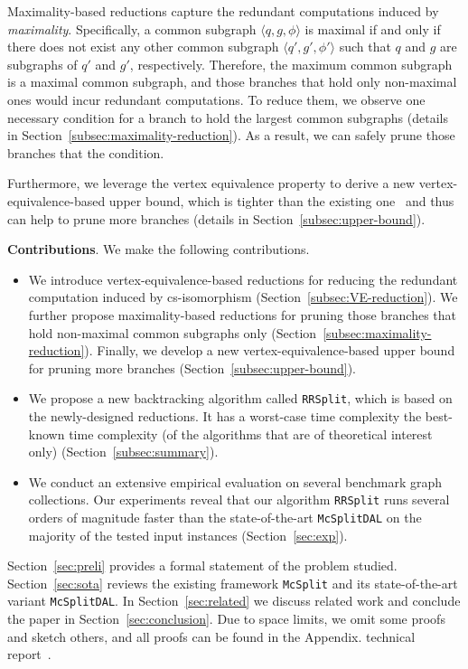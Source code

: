 Maximality-based reductions capture the redundant computations induced by \emph{maximality}. Specifically, a common subgraph $\langle q,g,\phi\rangle$ is maximal if and only if there does not exist any other common subgraph $\langle q',g',\phi' \rangle$ such that $q$ and $g$ are subgraphs of $q'$ and $g'$, respectively. Therefore, the maximum common subgraph is a maximal common subgraph, and those branches that hold only non-maximal ones {\chengD would} incur redundant computations. To reduce them,  we observe one necessary condition for a branch to hold the largest common subgraphs {\chengC (details  in Section~\ref{subsec:maximality-reduction})}. As a result, we can safely prune those branches that  the condition.

{\YuiR
Furthermore, we leverage the vertex equivalence property to derive a new vertex-equivalence-based upper bound, which is tighter than the existing one~\cite{mccreesh2017partitioning} and thus can help to prune more branches 
{\chengC (details in Section~\ref{subsec:upper-bound}).}
}



\smallskip
\noindent\textbf{Contributions}. We make the following  contributions.
\begin{itemize}[leftmargin=*]
    \item We introduce vertex-equivalence-based reductions for reducing the redundant computation induced by cs-isomorphism (Section~\ref{subsec:VE-reduction}). We further propose  maximality-based reductions for pruning those branches that hold non-maximal common {\chengE subgraphs} only  (Section~\ref{subsec:maximality-reduction}). {\YuiR Finally, we develop a new vertex-equivalence-based upper bound for pruning more branches  (Section~\ref{subsec:upper-bound}}).
    
    \item We propose a new backtracking algorithm called \texttt{RRSplit}, which is based on the newly-designed reductions. It has a worst-case time complexity  the best-known time complexity (of the algorithms that are of theoretical interest only) (Section~\ref{subsec:summary}). 
    
    \item We conduct an extensive empirical evaluation on {\chengE several} benchmark graph collections. Our experiments reveal that our algorithm \texttt{RRSplit} runs several orders of {\cheng magnitude} faster than the state-of-the-art \texttt{McSplitDAL} on the majority of the tested input instances (Section~\ref{sec:exp}). 
\end{itemize}

Section~\ref{sec:preli} provides a formal statement of the problem studied. Section~\ref{sec:sota} reviews the existing framework \texttt{McSplit} and its state-of-the-art variant \texttt{McSplitDAL}. In Section~\ref{sec:related} we discuss related work and conclude the paper in Section~\ref{sec:conclusion}. {
\YuiR Due to space limits, we omit some proofs and sketch others, and all proofs can be found in the 
\ifx \CR\undefined
Appendix. 
\else
technical report~\cite{TR}. 
\fi
}
